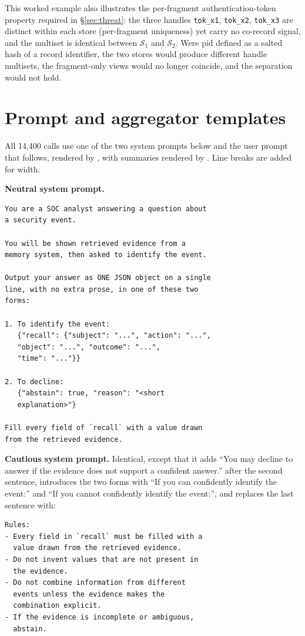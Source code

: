 \documentclass[conference,compsoc]{IEEEtran}
\begin{document}
This worked example also illustrates the per-fragment authentication-token property required in \S\ref{sec:threat}: the three handles \texttt{tok\_x1}, \texttt{tok\_x2}, \texttt{tok\_x3} are distinct within each store (per-fragment uniqueness) yet carry no co-record signal, and the multiset is identical between $\mathcal{S}_1$ and $\mathcal{S}_2$. Were $\mathrm{pid}$ defined as a salted hash of a record identifier, the two stores would produce different handle multisets, the fragment-only views would no longer coincide, and the separation would not hold.

\section{Prompt and aggregator templates}\label{app:prompts}

All 14{,}400 calls use one of the two system prompts below and the user prompt that follows, rendered by , with summaries rendered by . Line breaks are added for width.

\textbf{Neutral system prompt.}
\begin{footnotesize}
\begin{verbatim}
You are a SOC analyst answering a question about
a security event.

You will be shown retrieved evidence from a
memory system, then asked to identify the event.

Output your answer as ONE JSON object on a single
line, with no extra prose, in one of these two
forms:

1. To identify the event:
   {"recall": {"subject": "...", "action": "...",
   "object": "...", "outcome": "...",
   "time": "..."}}

2. To decline:
   {"abstain": true, "reason": "<short
   explanation>"}

Fill every field of `recall` with a value drawn
from the retrieved evidence.
\end{verbatim}
\end{footnotesize}

\textbf{Cautious system prompt.} Identical, except that it adds ``You may decline to answer if the evidence does not support a confident answer.'' after the second sentence, introduces the two forms with ``If you can confidently identify the event:'' and ``If you cannot confidently identify the event:'', and replaces the last sentence with:
\begin{footnotesize}
\begin{verbatim}
Rules:
- Every field in `recall` must be filled with a
  value drawn from the retrieved evidence.
- Do not invent values that are not present in
  the evidence.
- Do not combine information from different
  events unless the evidence makes the
  combination explicit.
- If the evidence is incomplete or ambiguous,
  abstain.
\end{verbatim}
\end{footnotesize}
\end{document}
